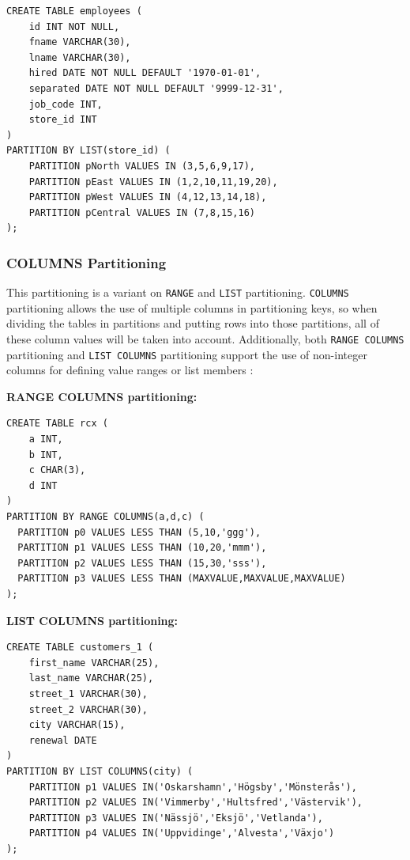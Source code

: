 \documentclass[12pt]{article}
\begin{document}
\begin{verbatim}
CREATE TABLE employees (
    id INT NOT NULL,
    fname VARCHAR(30),
    lname VARCHAR(30),
    hired DATE NOT NULL DEFAULT '1970-01-01',
    separated DATE NOT NULL DEFAULT '9999-12-31',
    job_code INT,
    store_id INT
)
PARTITION BY LIST(store_id) (
    PARTITION pNorth VALUES IN (3,5,6,9,17),
    PARTITION pEast VALUES IN (1,2,10,11,19,20),
    PARTITION pWest VALUES IN (4,12,13,14,18),
    PARTITION pCentral VALUES IN (7,8,15,16)
);
\end{verbatim}

\subsubsection{COLUMNS Partitioning}
This partitioning is a variant on \verb|RANGE| and \verb|LIST| partitioning. \verb|COLUMNS| partitioning allows the use of multiple columns in partitioning keys, so when dividing the tables in partitions and putting rows into those partitions, all of these column values will be taken into account. Additionally, both \verb|RANGE COLUMNS| partitioning and \verb|LIST COLUMNS| partitioning support the use of non-integer columns for defining value ranges or list members \parencite{PARTITIONING_COLUMNS}:

\vspace{0.3cm}
\noindent \textbf{RANGE COLUMNS partitioning:} 

\begin{verbatim}
CREATE TABLE rcx (
    a INT,
    b INT,
    c CHAR(3),
    d INT
)
PARTITION BY RANGE COLUMNS(a,d,c) (
  PARTITION p0 VALUES LESS THAN (5,10,'ggg'),
  PARTITION p1 VALUES LESS THAN (10,20,'mmm'),
  PARTITION p2 VALUES LESS THAN (15,30,'sss'),
  PARTITION p3 VALUES LESS THAN (MAXVALUE,MAXVALUE,MAXVALUE)
);
\end{verbatim}
    
\vspace{0.3cm}
\noindent
\textbf{LIST COLUMNS partitioning:} 

\begin{verbatim}
CREATE TABLE customers_1 (
    first_name VARCHAR(25),
    last_name VARCHAR(25),
    street_1 VARCHAR(30),
    street_2 VARCHAR(30),
    city VARCHAR(15),
    renewal DATE
)
PARTITION BY LIST COLUMNS(city) (
    PARTITION p1 VALUES IN('Oskarshamn','Högsby','Mönsterås'),
    PARTITION p2 VALUES IN('Vimmerby','Hultsfred','Västervik'),
    PARTITION p3 VALUES IN('Nässjö','Eksjö','Vetlanda'),
    PARTITION p4 VALUES IN('Uppvidinge','Alvesta','Växjo')
);
\end{verbatim}
\end{document}
